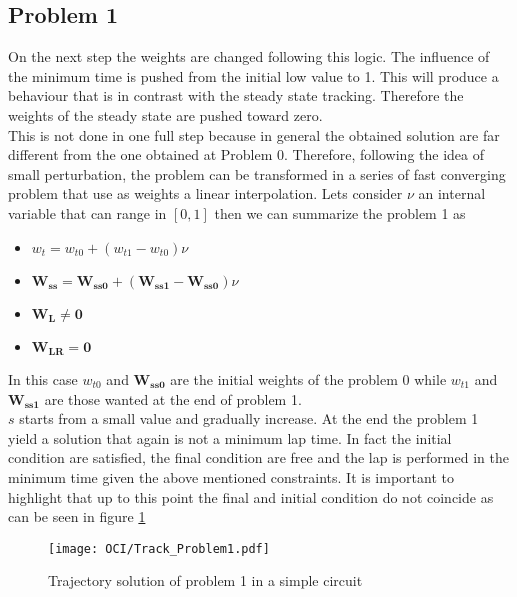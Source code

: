 \subsection{Problem 1}
%
On the next step the weights are changed following this logic. The influence of the minimum time is pushed from the initial low value to 1. This will produce a behaviour that is in contrast with the steady state tracking. Therefore the weights of the steady state are pushed toward zero.\\
This is not done in one full step because in general the obtained solution are far different from the one obtained at Problem 0. Therefore, following the idea of small perturbation, the problem can be transformed in a series of fast converging problem that use as weights a linear interpolation. Lets consider $\nu$ an internal variable that can range in $[0,1]$ then we can summarize the problem 1 as 
\begin{itemize}
    \item $w_t = w_{t0} + (w_{t1}-w_{t0})\nu $
    \item $\mathbf{W_{ss}} = \mathbf{W_{ss0}} + (\mathbf{W_{ss1}}-\mathbf{W_{ss0}})\nu $
    \item $\mathbf{W_{L}} \neq \mathbf{0}  $
    \item $\mathbf{W_{LR}} = \mathbf{0}$
\end{itemize}
In this case $w_{t0}$ and $\mathbf{W_{ss0}}$ are the initial weights of the problem 0 while $w_{t1}$ and $\mathbf{W_{ss1}}$ are those wanted at the end of problem 1.\\
$s$ starts from a small value and gradually increase. At the end the problem 1 yield a solution that again is not a minimum lap time. In fact the initial condition are satisfied, the final condition are free and the lap is performed in the minimum time given the above mentioned constraints. It is important to highlight that up to this point the final and initial condition do not coincide as can be seen in figure \ref{fig:Problem1}
%
\begin{figure}[h!]
    \centering
    \texttt{[image: OCI/Track\_Problem1.pdf]}
    \caption{Trajectory solution of problem 1 in a simple circuit}
    \label{fig:Problem1}
\end{figure}
%
%

